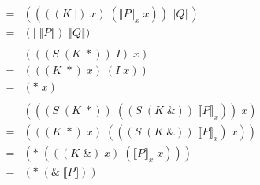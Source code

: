 \documentclass[a4paper,UKenglish]{lipics-v2016}
\newcommand{\interp}[1]{\llbracket #1 \rrbracket}
\begin{document}
\[\begin{array}{rl}
  =& ((((K\; |)\; x)\; (\interp{P}_x\; x))\; \interp{Q})\\
  =& (|\; \interp{P})\; \interp{Q})\\
  \\
  & (((S\; (K\; *))\; I)\; x)\\
  =&  (((K\; *)\; x)\; (I\; x))\\
  =&  (*\; x)\\
  \\
  & (((S\; (K\; *))\; ((S\; (K\; \&))\; \interp{P}_x))\; x)\\
  =&  (((K\; *)\; x)\; (((S\; (K\; \&))\; \interp{P}_x)\; x))\\
  =&  (*\; (((K\; \&)\; x)\; (\interp{P}_x\; x)))\\
  =&  (*\; (\&\; \interp{P}))\\
\end{array}\]



\end{document}
